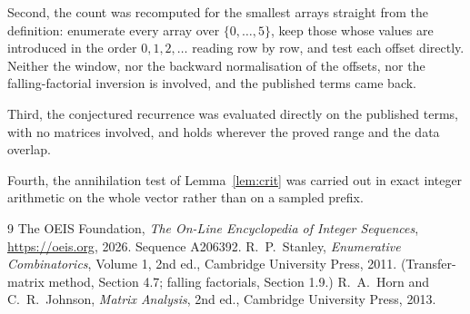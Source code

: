 \documentclass[11pt,a4paper]{article}
\theoremstyle{plain}
\theoremstyle{definition}
\begin{document}
Second, the count was recomputed for the smallest arrays straight from the definition:
enumerate every array over $\{0,\dots,5\}$, keep those whose values are introduced in the
order $0,1,2,\dots$ reading row by row, and test each offset directly. Neither the window, nor
the backward normalisation of the offsets, nor the falling-factorial inversion is involved, and
the published terms came back.

Third, the conjectured recurrence was evaluated directly on the published terms, with no
matrices involved, and holds wherever the proved range and the data overlap.

Fourth, the annihilation test of Lemma~\ref{lem:crit} was carried out in exact integer
arithmetic on the whole vector rather than on a sampled prefix.

\begin{thebibliography}{9}
 The OEIS Foundation, \emph{The On-Line Encyclopedia of Integer
Sequences}, \url{https://oeis.org}, 2026. Sequence A206392.
 R.~P.~Stanley, \emph{Enumerative Combinatorics}, Volume 1, 2nd ed.,
Cambridge University Press, 2011. (Transfer-matrix method, Section 4.7; falling factorials,
Section 1.9.)
 R.~A.~Horn and C.~R.~Johnson, \emph{Matrix Analysis}, 2nd ed., Cambridge
University Press, 2013.
\end{thebibliography}
\end{document}
